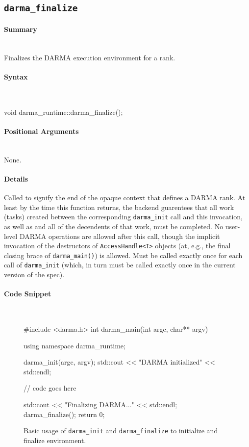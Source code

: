 
\subsection{\texttt{darma\_finalize}}
\label{ssec:api_fe_finalize}

\paragraph{Summary}\mbox{}\\
Finalizes the DARMA execution environment for a rank.

\paragraph{Syntax}\mbox{}\\ 
\begin{CppCode}
void darma_runtime::darma_finalize();
\end{CppCode}

\paragraph{Positional Arguments}\mbox{} \\
None. 

\paragraph{Details}\mbox{} 
Called to signify the end of the opaque context that defines a DARMA rank.  At
least by the time this function returns, the backend guarentees that all work
(tasks) created between the corresponding \texttt{darma\_init} call and this
invocation, as well as and all of the decendents of that work, must be
completed.  No user-level DARMA operations are allowed after this call, though
the implicit invocation of the destructors of \texttt{AccessHandle<T>} objects
(at, e.g., the final closing brace of \texttt{darma\_main()}) is allowed.  Must
be called exactly once for each call of \texttt{darma\_init} (which, in turn
must be called exactly once in the current version of the spec).

\paragraph{Code Snippet}\mbox{} \\
\begin{figure}[!h]
\begin{CppCodeNumb}
#include <darma.h>
int darma_main(int argc, char** argv)
{
  using namespace darma_runtime;

  darma_init(argc, argv);
  std::cout << "DARMA initialized" << std::endl;

  // code goes here

  std::cout << "Finalizing DARMA..." << std::endl;
  darma_finalize();
  return 0;
}
\end{CppCodeNumb}
\caption{Basic usage of \texttt{darma\_init} and \texttt{darma\_finalize} 
to initialize and finalize environment.}
\label{fig:fe_api_init}
\end{figure}

